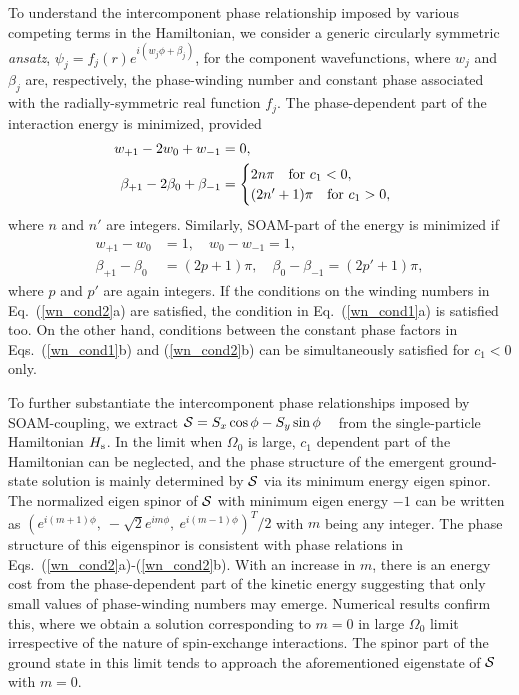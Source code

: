 \documentclass[pra,twocolumn,aps,superscriptaddress,showpacs,longbibliography]{revtex4-1}
\begin{document}
To understand the intercomponent phase relationship imposed by various competing terms in
the Hamiltonian, we consider a generic circularly symmetric {\em ansatz}, $\psi_j = f_j(r)e^{i(w_j \phi + \beta_j)}$,
for the component wavefunctions, where $w_j$ and $\beta_j$ are, respectively, the phase-winding number and constant phase associated with
the radially-symmetric real function $f_j$. The phase-dependent part of the interaction energy is minimized, provided~\cite{PhysRevA.66.023602}
\begin{subequations}\label{wn_cond1}
\begin{align}
w_{+1}-2w_0+w_{-1} &= 0,\\ 
\beta_{+1}-2\beta_0+\beta_{-1} &= \begin{cases} 2n\pi\quad{\rm for}~c_1<0,\\
(2n'+1)\pi\quad{\rm for}~c_1>0,
\end{cases}
\end{align}
\end{subequations}
where $n$ and $n'$ are integers.
Similarly, SOAM-part of the energy is minimized if
\begin{subequations}\label{wn_cond2}
\begin{align}
w_{+1} - w_{0} &= 1,\quad w_0-w_{-1} = 1,\\
\beta_{+1} - \beta_0 &= (2p+1)\pi,\quad \beta_0-\beta_{-1} = (2p'+1)\pi,
\end{align}
\end{subequations}
where $p$ and $p'$ are again integers.
If the conditions on the winding numbers in Eq.~(\ref{wn_cond2}a) are satisfied, the
condition in Eq.~(\ref{wn_cond1}a) is satisfied too. On the other hand,
conditions between the constant phase factors in Eqs.~(\ref{wn_cond1}b) and (\ref{wn_cond2}b)
can be simultaneously satisfied for $c_1<0$ only. 


To further substantiate the intercomponent phase relationships imposed by SOAM-coupling, we 
extract ${\cal S} = S_x \cos\phi-S_y \sin\phi$ ~\cite{duan2020symmetry} from the single-particle Hamiltonian $H_{\rm s}$.
In the limit when $\Omega_0$ is large, $c_1$ dependent part of the Hamiltonian can be neglected, and the phase structure
of the emergent ground-state solution is mainly determined by ${\cal S}$ via its minimum energy eigen spinor.
The normalized eigen spinor of ${\cal S}$ with minimum eigen energy $-1$ can be written as
$(e^{i(m+1)\phi},~-\sqrt{2}e^{im\phi},~e^{i(m-1)\phi} )^T/2$ with $m$ being any integer.
The phase structure of this eigenspinor is consistent with phase relations in Eqs.~(\ref{wn_cond2}a)-(\ref{wn_cond2}b).
With an increase in $m$, there is an energy cost from the phase-dependent part of the kinetic
energy suggesting that only small values of phase-winding numbers may emerge. Numerical
results confirm this, where we obtain a solution corresponding to $m = 0$ in large $\Omega_0$ limit irrespective
of the nature of spin-exchange interactions.
The spinor part of the ground state in this limit tends to approach the aforementioned eigenstate of ${\cal S}$ with $m = 0$. 
\end{document}
